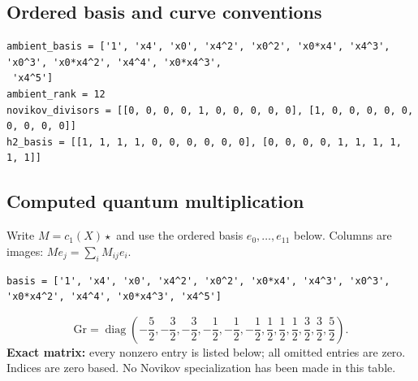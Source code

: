 \documentclass[10pt,a4paper]{article}
\begin{document}
\subsection*{Ordered basis and curve conventions}
\begin{lstlisting}
ambient_basis = ['1', 'x4', 'x0', 'x4^2', 'x0^2', 'x0*x4', 'x4^3', 'x0^3', 'x0*x4^2', 'x4^4', 'x0*x4^3',
 'x4^5']
ambient_rank = 12
novikov_divisors = [[0, 0, 0, 0, 1, 0, 0, 0, 0, 0], [1, 0, 0, 0, 0, 0, 0, 0, 0, 0]]
h2_basis = [[1, 1, 1, 1, 0, 0, 0, 0, 0, 0], [0, 0, 0, 0, 1, 1, 1, 1, 1, 1]]
\end{lstlisting}
\subsection*{Computed quantum multiplication}
Write $M=c_1(X)\star$ and use the ordered basis $e_0,\ldots,e_{11}$ below. Columns are images: $M e_j=\sum_i M_{ij}e_i$.
\begin{lstlisting}
basis = ['1', 'x4', 'x0', 'x4^2', 'x0^2', 'x0*x4', 'x4^3', 'x0^3', 'x0*x4^2', 'x4^4', 'x0*x4^3', 'x4^5']
\end{lstlisting}
\[\mathrm{Gr}=\operatorname{diag}\!\left(- \frac{5}{2},- \frac{3}{2},- \frac{3}{2},- \frac{1}{2},- \frac{1}{2},- \frac{1}{2},\frac{1}{2},\frac{1}{2},\frac{1}{2},\frac{3}{2},\frac{3}{2},\frac{5}{2}\right).\]
\textbf{Exact matrix:} every nonzero entry is listed below; all omitted entries are zero. Indices are zero based. No Novikov specialization has been made in this table.
\end{document}
